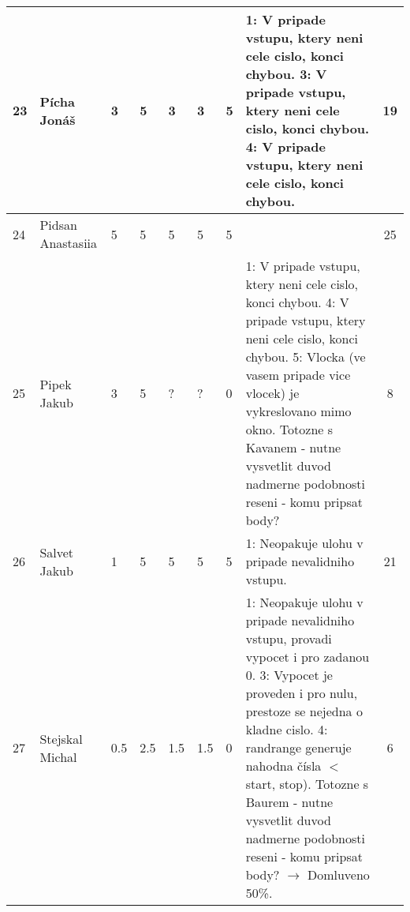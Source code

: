 \documentclass[landscape, 12pt]{article}
\begin{document}
\begin{longtable}{|l l | C{0.7cm} | C{0.7cm} | C{0.7cm} | C{0.7cm} | C{0.7cm} | L{15cm} |c|}
  23 & Pícha Jonáš        &       3 &       5 &       3 &       3 &       5 & 1: V pripade vstupu, ktery neni cele cislo, konci chybou. 3: V pripade vstupu, ktery neni cele cislo, konci chybou. 4: V pripade vstupu, ktery neni cele cislo, konci chybou.                                                                                                                                                                                                                             &       19 \\
\hline

  24 & Pidsan Anastasiia  &       5 &       5 &       5 &       5 &       5 &                                                                                                                                                                                                                                                                                                                                                                                      &       25 \\
\hline

  25 & Pipek Jakub        &       3 &       5 &       ? &       ? &       0 & 1: V pripade vstupu, ktery neni cele cislo, konci chybou. 4: V pripade vstupu, ktery neni cele cislo, konci chybou. 5: Vlocka (ve vasem pripade vice vlocek) je vykreslovano mimo okno.                                                                                                                Totozne s Kavanem - nutne vysvetlit duvod nadmerne podobnosti reseni - komu pripsat body?                                                                                                                   &       8 \\
\hline

  26 & Salvet Jakub       &       1 &       5 &       5 &       5 &       5 & 1: Neopakuje ulohu v pripade nevalidniho vstupu.                                                                                                                                                                                                                                                                                                                                        &       21 \\
\hline

  27 & Stejskal Michal    &       0.5 &       2.5 &       1.5 &       1.5 &       0 & 1: Neopakuje ulohu v pripade nevalidniho vstupu, provadi vypocet i pro zadanou 0. 3: Vypocet je proveden i pro nulu, prestoze se nejedna o kladne cislo. 4: randrange generuje nahodna čísla \ensuremath{<}start, stop). Totozne s Baurem - nutne vysvetlit duvod nadmerne podobnosti reseni - komu pripsat body? $\rightarrow$ Domluveno 50\%.                                                                                                                                                                                 &       6 \\
\hline


\end{longtable}
\end{document}
